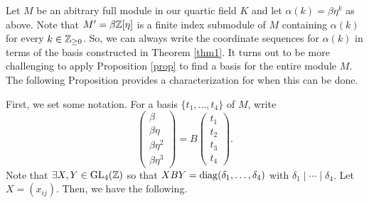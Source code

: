 \documentclass[11pt]{amsart}
\begin{document}
\begin{rmk} Let $M$ be an abitrary full module in our quartic field $K$ and let $\alpha(k)=\beta \eta^k$ as above. Note that $M'=\beta \mathbb{Z}[\eta]$ is a finite index submodule of $M$ containing $\alpha(k)$ for every $k \in \mathbb{Z}_{\geq 0}$. So, we can always write the coordinate sequences for $\alpha(k)$ in terms of the basis constructed in Theorem \ref{thm1}. It turns out to be more challenging to apply Proposition \ref{prop} to find a basis for the entire module $M$. The following Proposition provides a characterization for when this can be done. \end{rmk}

First, we set some notation. For a basis $\{t_1, \dots, t_4\}$ of $M$, write
\[\begin{pmatrix} \beta \\ \beta \eta \\ \beta \eta^2 \\ \beta\eta^3 \end{pmatrix} = B \begin{pmatrix} t_1 \\ t_2 \\ t_3 \\ t_4 \end{pmatrix}.\]
Note that $\exists X, Y \in \operatorname{GL}_4(\mathbb{Z})$ so that $XBY=\operatorname{diag}(\delta_1, \dots, \delta_4)$ with $\delta_1 \mid \cdots \mid \delta_4$. Let $X=(x_{ij})$. Then, we have the following.
\end{document}
